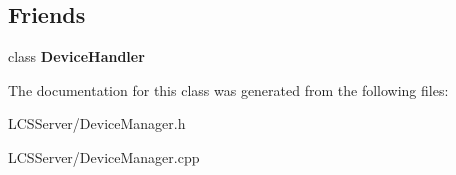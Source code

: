 \subsection*{Friends}
\begin{DoxyCompactItemize}
\item 
\mbox{\label{class_device_manager_a2fd82f6ba5a09bc3061ec8fe2ce5098b}} 
class {\bfseries Device\+Handler}
\end{DoxyCompactItemize}


The documentation for this class was generated from the following files\+:\begin{DoxyCompactItemize}
\item 
L\+C\+S\+Server/Device\+Manager.\+h\item 
L\+C\+S\+Server/Device\+Manager.\+cpp\end{DoxyCompactItemize}
